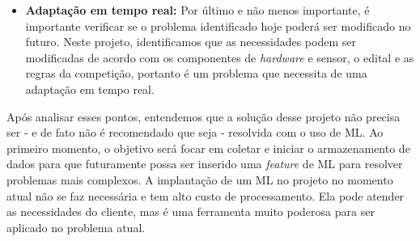 \begin{apendicesenv}
\begin{itemize}
    \item \textbf{Adaptação em tempo real:} Por último e não menos importante, é importante verificar se o problema identificado hoje poderá ser modificado no futuro. Neste projeto, identificamos que as necessidades podem ser modificadas de acordo com os componentes de \textit{hardware} e sensor, o edital e as regras da competição, portanto é um problema que necessita de uma adaptação em tempo real.
\end{itemize}

\par Após analisar esses pontos, entendemos que a solução desse projeto não precisa ser - e de fato não é recomendado que seja - resolvida com o uso de ML. Ao primeiro momento, o objetivo será focar em coletar e iniciar o armazenamento de dados para que futuramente possa ser inserido uma \textit{feature} de ML para resolver problemas mais complexos. A implantação de um ML no projeto no momento atual não se faz necessária e tem alto custo de processamento. Ela pode atender as necessidades do cliente, mas é uma ferramenta muito poderosa para ser aplicado no problema atual.



\end{apendicesenv}
